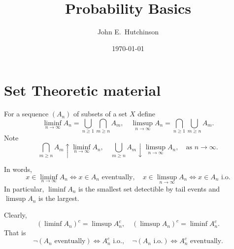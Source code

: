 \documentclass[a4paper]{amsart}
\theoremstyle{plain}
\theoremstyle{definition}
\theoremstyle{remark}
\begin{document}
\title{Probability Basics}  
\author{John E.\ Hutchinson}
\date{\today}


\maketitle

\tableofcontents


\section{Set Theoretic material} 

 For a sequence $ (A_n) $ of subsets of a set $ X $ define
 \begin{equation} \label{df} 
 \liminf_{n\to \infty} A_n = \bigcup_{n \geq 1}\bigcap_{m\geq n} A_m,  \quad
 \limsup_{n\to \infty}  A_n = \bigcap_{n \geq 1}\bigcup_{m\geq n} A_m.
\end{equation} 
 Note
\begin{equation} \label{lim} 
 \bigcap_{m\geq n} A_m  \uparrow \liminf_{n\to \infty}  A_n ,  \quad
  \bigcup_{m\geq n} A_m  \downarrow \limsup_{n\to \infty}  A_n,   \quad \text{as } n \to \infty.
\end{equation} 


 In words, 
\begin{equation} \label{words} 
x \in \liminf_{n\to \infty} A_n \Longleftrightarrow  x \in A_n \text{ eventually}, \quad 
x \in \limsup_{n\to \infty} A_n \Longleftrightarrow  x \in A_n \text{ i.o.} 
\end{equation}  
  In particular,   $  \liminf A_n $  is the smallest set detectible by tail events and $  \limsup A_n $  is the largest. 

Clearly,
\begin{equation} \label{dm} 
(\liminf A_n)^c = \limsup  A_n^c, \quad (\limsup A_n)^c = \liminf A_n^c.
\end{equation} 
That is
\begin{equation} \label{}
\neg (A_n \text{ eventually}) \Longleftrightarrow   A_n^c \text{ i.o.}, \quad 
\neg (A_n \text{ i.o.}) \Longleftrightarrow   A_n^c \text{ eventually}.
\end{equation} 
\end{document}
